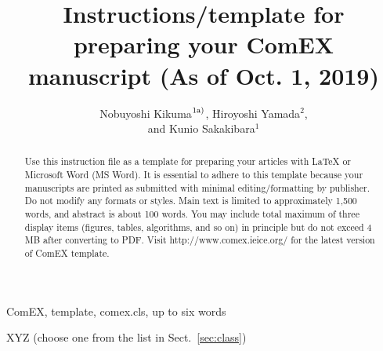 \documentclass{comex}
\title{Instructions/template for\\
preparing your ComEX\\
manuscript (As of Oct. 1, 2019)}
\author{Nobuyoshi Kikuma$^{\rm 1a)}$, Hiroyoshi Yamada$^{2}$,\\ and Kunio Sakakibara$^{1}$}
\begin{document}
\maketitle

\begin{abstract}
Use this instruction file as a template for preparing your articles with
\LaTeX{} or Microsoft Word (MS Word). It is essential to adhere to this
template because your manuscripts are printed as submitted with minimal
editing/formatting by publisher. Do not modify any formats or
styles. Main text is limited to approximately 1,500 words, and abstract is about 100
words. You may include total maximum of three display items (figures, tables, algorithms, 
and so on) in principle but do not exceed 4 MB after converting to PDF.
Visit http://www.comex.ieice.org/ for the latest version of ComEX template.
\end{abstract}

\begin{keywords}
ComEX, template, comex.cls, up to six words
\end{keywords}

\begin{classification}
XYZ (choose one from the list in Sect.~\ref{sec:class})
\end{classification}

\end{document}
